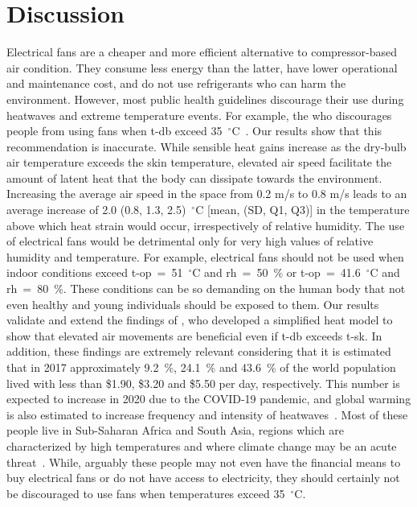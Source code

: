 
\section{Discussion}\label{sec:discussion}

Electrical fans are a cheaper and more efficient alternative to compressor-based air condition.
They consume less energy than the latter, have lower operational and maintenance cost, and do not use refrigerants who can harm the environment.
However, most public health guidelines discourage their use during heatwaves and extreme temperature events.
For example, the \ac{who} discourages people from using fans when \acf{t-db} exceed 35~$^{\circ}$C~\cite{WMO2015}.
Our results show that this recommendation is inaccurate.
While sensible heat gains increase as the dry-bulb air temperature exceeds the skin temperature, elevated air speed facilitate the amount of latent heat that the body can dissipate towards the environment.
Increasing the average air speed in the space from 0.2 m/s to 0.8 m/s leads to an average increase of 2.0 (0.8, 1.3, 2.5)~$^{\circ}$C [mean, (SD, Q1, Q3)] in the temperature above which heat strain would occur, irrespectively of relative humidity.
The use of electrical fans would be detrimental only for very high values of relative humidity and temperature.
For example, electrical fans should not be used when indoor conditions exceed \ac{t-op}~=~51~$^{\circ}$C and \ac{rh}~=~50~\% or \ac{t-op}~=~41.6~$^{\circ}$C and \ac{rh}~=~80~\%.
These conditions can be so demanding on the human body that not even healthy and young individuals should be exposed to them.
Our results validate and extend the findings of , who developed a simplified heat model to show that elevated air movements are beneficial even if \ac{t-db} exceeds \acf{t-sk}.
In addition, these findings are extremely relevant considering that it is estimated that in 2017 approximately 9.2~\%, 24.1~\% and 43.6~\% of the world population lived with less than \$1.90, \$3.20 and \$5.50 per day, respectively.
This number is expected to increase in 2020 due to the COVID-19 pandemic, and global warming is also estimated to increase frequency and intensity of heatwaves~\cite{PovertyO1:online}.
Most of these people live in Sub-Saharan Africa and South Asia, regions which are characterized by high temperatures and where climate change may be an acute threat~\cite{PovertyO1:online}.
While, arguably these people may not even have the financial means to buy electrical fans or do not have access to electricity, they should certainly not be discouraged to use fans when temperatures exceed 35~$^{\circ}$C\@.
